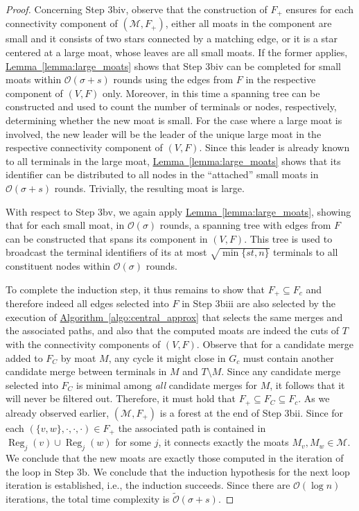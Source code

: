 \documentclass[letterpaper,11pt]{article}
\newcommand{\namedref}[2]{\hyperref[#2]{#1~\ref*{#2}}}
\newcommand{\lemmaref}[1]{\namedref{Lemma}{#1}}
\newcommand{\algref}[1]{\namedref{Algorithm}{#1}}
\newcommand{\BO}{\mathcal{O}}
\newcommand{\sO}{\tilde{\mathcal{O}}}
\newcommand{\M}{\mathcal{M}}
\DeclareMathOperator{\reg}{Reg}
\begin{document}
\begin{proof}
Concerning Step 3biv, observe that the construction of $F_+$ ensures for each
connectivity component of $(\M,F_+)$, either all moats in the component are
small and it consists of two stars connected by a matching edge, or it is a star
centered at a large moat, whose leaves are all small moats. If the former
applies, \lemmaref{lemma:large_moats} shows that Step 3biv can be completed for
small moats within $\BO(\sigma+s)$ rounds using the edges from $F$ in the
respective component of $(V,F)$ only. Moreover, in this time a spanning tree can
be constructed and used to count the number of terminals or nodes, respectively,
determining whether the new moat is small. For the case where a large moat is
involved, the new leader will be the leader of the unique large moat in the
respective connectivity component of $(V,F)$. Since this leader is already known
to all terminals in the large moat, \lemmaref{lemma:large_moats} shows that its
identifier can be distributed to all nodes in the ``attached'' small moats in
$\BO(\sigma+s)$ rounds. Trivially, the resulting moat is large.

With respect to Step 3bv, we again apply \lemmaref{lemma:large_moats}, showing
that for each small moat, in $\BO(\sigma)$ rounds, a spanning tree with edges
from $F$ can be constructed that spans its component in $(V,F)$. This tree is
used to broadcast the terminal identifiers of its at most $\sqrt{\min\{st,n\}}$
terminals to all constituent nodes within $\BO(\sigma)$ rounds.

To complete the induction step, it thus remains to show that $F_+\subseteq F_c$
and therefore indeed all edges selected into $F$ in Step 3biii are also selected
by the execution of \algref{algo:central_approx} that selects the same merges
and the associated paths, and also that the computed moats are indeed the cuts
of $T$ with the connectivity components of $(V,F)$. Observe that for a candidate
merge added to $F_C$ by moat $M$, any cycle it might close in $G_c$ must contain
another candidate merge between terminals in $M$ and $T\setminus M$. Since any
candidate merge selected into $F_C$ is minimal among \emph{all} candidate merges
for $M$, it follows that it will never be filtered out. Therefore, it must
hold that $F_+\subseteq F_C\subseteq F_c$. As we already observed earlier,
$(\M,F_+)$ is a forest at the end of Step 3bii. Since for each
$(\{v,w\},\cdot,\cdot,\cdot)\in F_+$ the associated path is contained in
$\reg_j(v)\cup \reg_j(w)$ for some $j$, it connects exactly the moats
$M_v,M_w\in \M$. We conclude that the new moats are exactly those computed in
the iteration of the loop in Step 3b. We conclude that the induction hypothesis
for the next loop iteration is established, i.e., the induction succeeds. Since
there are $\BO(\log n)$ iterations, the total time complexity is
$\sO(\sigma+s)$.
\end{proof}
\end{document}
